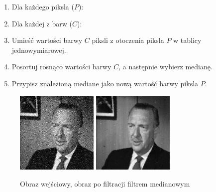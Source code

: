 \documentclass[final,a4paper,openany,12pt]{mwbk}
\begin{document}
\begin{enumerate}
	\item Dla każdego piksla ($P$):
	\item Dla każdej z barw ($C$):
	\item Umieść wartości barwy $C$ piksli z otoczenia piksla $P$ w tablicy jednowymiarowej.
	\item Posortuj rosnąco wartości barwy $C$, a następnie wybierz medianę.
	\item Przypisz znalezioną mediane jako nową wartość barwy piksla $P$.
\end{enumerate}

\begin{figure}[H]
	\begin{center}
		\includegraphics[width=0.35\textwidth]{gentelman_gray_noise}
		\includegraphics[width=0.35\textwidth]{gentelman_gray_noise_median_result}
	\end{center}
	\caption{Obraz wejściowy, obraz po filtracji filtrem medianowym}
\end{figure}
\end{document}
